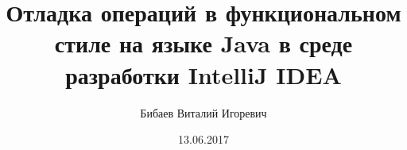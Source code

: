 \documentclass{beamer}
\title[]{Отладка операций в функциональном стиле на языке Java в среде разработки IntelliJ IDEA} %
\author{Бибаев Виталий Игоревич} %
\institute[СПБАУ] %
{
Научный руководитель:  Ушаков Егор Анатольевич\\
\medskip
САНКТ-ПЕТЕРБУРГСКИЙ АКАДЕМИЧЕСКИЙ УНИВЕРСИТЕТ \\ %
\medskip
\textit{vitaliy.bibaev@gmail.com} %
}
\date{13.06.2017} %
\begin{document}
\begin{frame}
\titlepage %
\end{frame}




%
\end{document}
